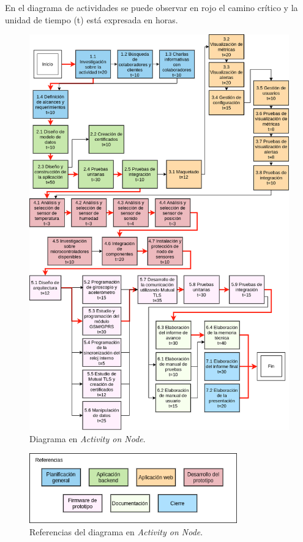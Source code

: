 \documentclass[
11pt, %
codirector, %
]{charter}
\begin{document}
En el diagrama de actividades se puede observar en rojo el camino crítico y la unidad de tiempo (t) está expresada en horas.

\begin{figure}[htpb]
\centering 
\includegraphics[width=1\textwidth]{./Figuras/Activity-on-node-v4.png}
\caption{Diagrama en \textit{Activity on Node}.}
\label{fig:AoN}
\end{figure}

\begin{figure}[htpb]
\centering 
\includegraphics[width=0.8\textwidth]{./Figuras/Ref-Activity-on-node.png}
\caption{Referencias del diagrama en \textit{Activity on Node}.}
\label{fig:Ref_fordAoN}
\end{figure}
\end{document}
